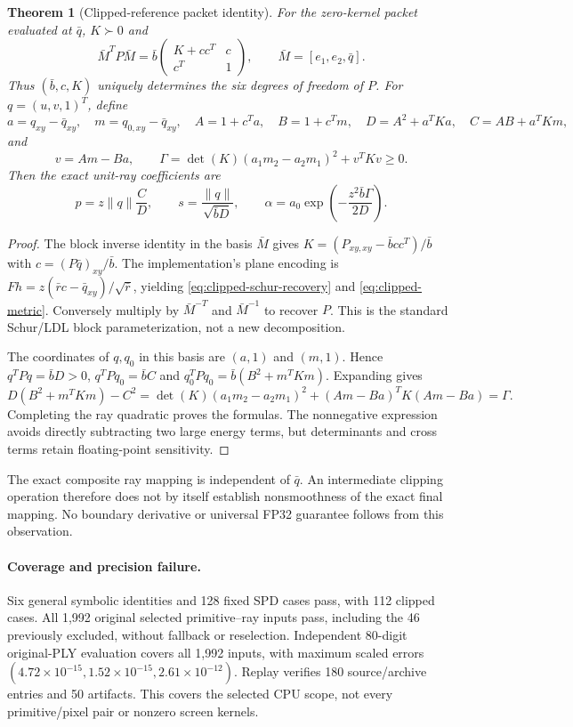 \documentclass[11pt,a4paper]{article}
\newtheorem{theorem}{Theorem}
\begin{document}
\begin{theorem}[Clipped-reference packet identity]\label{thm:clipped-packet}
For the zero-kernel packet evaluated at $\bar q$, $K\succ0$ and
\begin{equation}\label{eq:clipped-metric}
 \bar M^TP\bar M=\bar b
 \begin{pmatrix}K+cc^T&c\\c^T&1\end{pmatrix},\qquad
 \bar M=[e_1,e_2,\bar q].
\end{equation}
Thus $(\bar b,c,K)$ uniquely determines the six degrees of freedom of $P$.
For $q=(u,v,1)^T$, define
\[
 a=q_{xy}-\bar q_{xy},\quad m=q_{0,xy}-\bar q_{xy},\quad
 A=1+c^Ta,\quad B=1+c^Tm,\quad D=A^2+a^TKa,\quad C=AB+a^TKm,
\]
and
\begin{equation}\label{eq:clipped-gram}
 v=Am-Ba,\qquad
 \Gamma=\det(K)(a_1m_2-a_2m_1)^2+v^TKv\ge0.
\end{equation}
Then the exact unit-ray coefficients are
\[
 p=z\|q\|\frac{C}{D},\qquad s=\frac{\|q\|}{\sqrt{\bar bD}},\qquad
 \alpha=a_0\exp\!\left(-\frac{z^2\bar b\Gamma}{2D}\right).
\]
\end{theorem}
\begin{proof}
The block inverse identity in the basis $\bar M$ gives
$K=(P_{xy,xy}-\bar bcc^T)/\bar b$ with $c=(P\bar q)_{xy}/\bar b$.
The implementation's plane encoding is
$Fh=z(\bar r c-\bar q_{xy})/\sqrt{\bar r}$, yielding
\eqref{eq:clipped-schur-recovery} and \eqref{eq:clipped-metric}.
Conversely multiply by $\bar M^{-T}$ and $\bar M^{-1}$ to recover $P$.
This is the standard Schur/LDL block parameterization, not a new decomposition.

The coordinates of $q,q_0$ in this basis are $(a,1)$ and $(m,1)$.
Hence $q^TPq=\bar bD>0$, $q^TPq_0=\bar bC$ and
$q_0^TPq_0=\bar b(B^2+m^TKm)$. Expanding gives
\[
 D(B^2+m^TKm)-C^2
 =\det(K)(a_1m_2-a_2m_1)^2+(Am-Ba)^TK(Am-Ba)=\Gamma.
\]
Completing the ray quadratic proves the formulas. The nonnegative
expression avoids directly subtracting two large energy terms,
but determinants and cross terms retain floating-point sensitivity.
\end{proof}

The exact composite ray mapping is independent of $\bar q$.
An intermediate clipping operation therefore does not by itself
establish nonsmoothness of the exact final mapping. No boundary
derivative or universal FP32 guarantee follows from this observation.

\paragraph{Coverage and precision failure.}
Six general symbolic identities and 128 fixed SPD cases pass, with
112 clipped cases. All 1,992 original selected primitive--ray inputs
pass, including the 46 previously excluded, without fallback or
reselection. Independent 80-digit original-PLY evaluation covers all
1,992 inputs, with maximum scaled errors
$(4.72\times10^{-15},1.52\times10^{-15},2.61\times10^{-12})$.
Replay verifies 180 source/archive entries and 50 artifacts.
This covers the selected CPU scope, not every primitive/pixel pair
or nonzero screen kernels.
\end{document}

